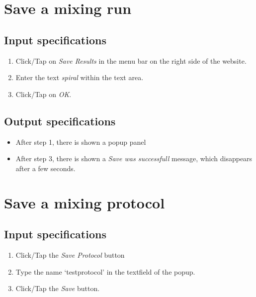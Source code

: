 \section{Save a mixing run}

\subsection*{Input specifications}
\begin{enumerate}
\item Click/Tap on \emph{Save Results} in the menu bar on the right side of the website.
\item Enter the text \emph{spiral} within the text area.
\item Click/Tap on \emph{OK}.
\end{enumerate}

\subsection*{Output specifications}
\begin{itemize}
\item After step 1, there is shown a popup panel
\item After step 3, there is shown a \emph{Save was successfull} message, which disappears after a few seconds.
\end{itemize}

\section{Save a mixing protocol}

\subsection*{Input specifications}
\begin{enumerate}
\item Click/Tap the \emph{Save Protocol} button
\item Type the name `testprotocol' in the textfield of the popup.
\item Click/Tap the \emph{Save} button.
\end{enumerate}

